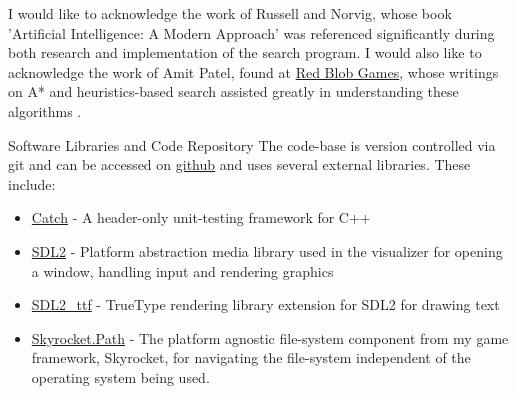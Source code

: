 \begin{acknowledgements}
	I would like to acknowledge the work of Russell and Norvig, whose book 'Artificial Intelligence: A Modern Approach' \parencite{aiama} was referenced significantly during both research and implementation of the search program. I would also like to acknowledge the work of Amit Patel, found at \href{http://www.redblobgames.com/}{Red Blob Games}, whose writings on A* and heuristics-based search assisted greatly in understanding these algorithms \parencite{redblob}.
\end{acknowledgements}

\vspace{2em}

\begin{frontmatter}{Software Libraries and Code Repository}
The code-base is version controlled via git and can be accessed on \href{https://github.com/jacobmilligan/robonav}{github} and uses several external libraries. These include:
\begin{itemize}
	\item \href{https://github.com/philsquared/Catch}{Catch} - A header-only unit-testing framework for C++
	\item \href{https://www.libsdl.org/download-2.0.php}{SDL2} - Platform abstraction media library used in the visualizer for opening a window, handling input and rendering graphics
	\item \href{https://www.libsdl.org/projects/SDL_ttf/}{SDL2\_ttf} - TrueType rendering library extension for SDL2 for drawing text
	\item \href{https://github.com/jacobmilligan/Skyrocket}{Skyrocket.Path} - The platform agnostic file-system component from my game framework, Skyrocket, for navigating the file-system independent of the operating system being used.
\end{itemize}
\end{frontmatter}
